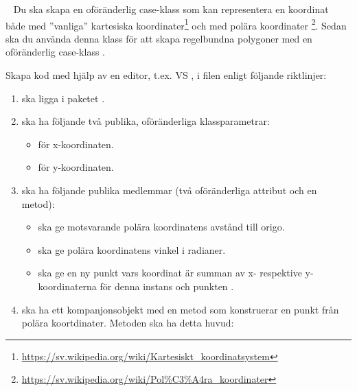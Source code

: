 \Task \what~
Du ska skapa en oföränderlig case-klass  som kan representera en koordinat både med ''vanliga'' kartesiska koordinater\footnote{\url{https://sv.wikipedia.org/wiki/Kartesiskt_koordinatsystem}} och med polära koordinater
\footnote{\url{https://sv.wikipedia.org/wiki/Pol\%C3\%A4ra\_koordinater}}. Sedan ska du använda denna klass för att skapa regelbundna polygoner med en oföränderlig case-klass .

\Subtask Skapa kod med hjälp av en editor, t.ex. VS , i filen  enligt följande riktlinjer:
\begin{enumerate}[noitemsep]
\item {} ska ligga i paketet .

\item {} ska ha följande två publika, oföränderliga klassparametrar:
\begin{itemize}[nolistsep, noitemsep]
\item {} för x-koordinaten.
\item {} för y-koordinaten.
\end{itemize}

\item {} ska ha följande publika medlemmar (två oföränderliga attribut och en metod):
\begin{itemize}[nolistsep, noitemsep]
\item {} ska ge motsvarande polära koordinatens avstånd till origo.
\item {} ska ge polära koordinatens vinkel i radianer.
\item {} ska ge en ny punkt vars koordinat är summan av x- respektive y-koordinaterna för denna instans och punkten .
\end{itemize}

\item {} ska ha ett kompanjonsobjekt med en metod som konstruerar en punkt från polära koortdinater. Metoden ska ha detta huvud: \\

\end{enumerate}

